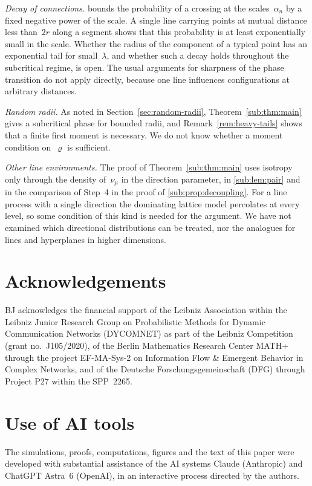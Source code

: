 \documentclass[11pt,letterpaper]{article}
\begin{document}
\emph{Decay of connections.}  bounds the probability of a crossing at the scales~$\alpha_n$ by a fixed negative power of the scale. A single line carrying points at mutual distance less than~$2r$ along a segment shows that this probability is at least exponentially small in the scale. Whether the radius of the component of a typical point has an exponential tail for small~$\lambda$, and whether such a decay holds throughout the subcritical regime, is open. The usual arguments for sharpness of the phase transition do not apply directly, because one line influences configurations at arbitrary distances.

\emph{Random radii.} As noted in Section~\ref{sec:random-radii}, Theorem~\ref{sub:thm:main} gives a subcritical phase for bounded radii, and Remark~\ref{rem:heavy-tails} shows that a finite first moment is necessary. We do not know whether a moment condition on~$\varrho$ is sufficient.

\emph{Other line environments.} The proof of Theorem~\ref{sub:thm:main} uses isotropy only through the density of~$\nu_\mu$ in the direction parameter, in \cref{sub:lem:pair} and in the comparison of Step~4 in the proof of \cref{sub:prop:decoupling}. For a line process with a single direction the dominating lattice model percolates at every level, so some condition of this kind is needed for the argument. We have not examined which directional distributions can be treated, nor the analogues for lines and hyperplanes in higher dimensions.

\section*{Acknowledgements}

BJ acknowledges the financial support of the Leibniz Association within the Leibniz Junior Research Group on Probabilistic Methods for Dynamic Communication Networks (DYCOMNET) as part of the Leibniz Competition (grant no.~J105/2020), of the Berlin Mathematics Research Center MATH+ through the project EF-MA-Sys-2 on Information Flow \& Emergent Behavior in Complex Networks, and of the Deutsche Forschungsgemeinschaft (DFG) through Project P27 within the SPP~2265.

\section*{Use of AI tools}

The simulations, proofs, computations, figures and the text of this paper were developed with substantial assistance of the AI systems Claude (Anthropic) and ChatGPT Astra~6 (OpenAI), in an interactive process directed by the authors.



\end{document}
